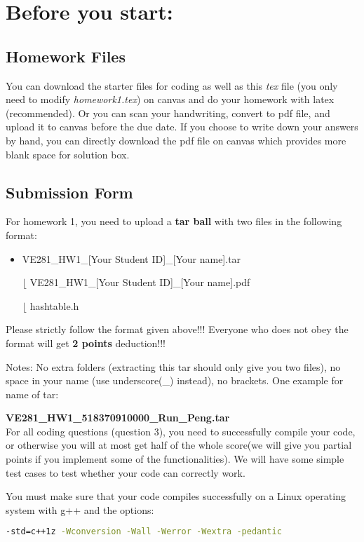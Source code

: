 \documentclass[11pt]{exam}
\begin{document}
\setlength{\parindent}{0pt}
\section*{Before you start:}

\subsection*{Homework Files}
You can download the starter files for coding as well as this \textit{tex} file (you only need to modify \textit{homework1.tex}) on canvas and do your homework with latex (recommended). Or you can scan your handwriting, convert to pdf file, and upload it to canvas before the due date. If you choose to write down your answers by hand, you can directly download the pdf file on canvas which provides more blank space for solution box.\\

\subsection*{Submission Form}
For homework 1, you need to upload a \textbf{tar ball} with two files in the following format:
\begin{itemize}
\item VE281\_HW1\_[Your Student ID]\_[Your name].tar

$\lfloor$ VE281\_HW1\_[Your Student ID]\_[Your name].pdf

$\lfloor$ hashtable.h

\end{itemize}
{\color{red}Please strictly follow the format given above!!! Everyone who does not obey the format will get \textbf{2 points} deduction!!!}

Notes: No extra folders (extracting this tar should only give you two files), no space in your name (use underscore(\_) instead), no brackets. One example for name of tar:

\textbf{VE281\_HW1\_518370910000\_Run\_Peng.tar}\\

For all coding questions (question 3), you need to successfully compile your code, or otherwise you will at most get half of the whole score(we will give you partial points if you implement some of the functionalities). We will have some simple test cases to test whether your code can correctly work.

You must make sure that your code compiles successfully on a Linux operating system with g++ and the options:
\begin{lstlisting}[language=bash]
-std=c++1z -Wconversion -Wall -Werror -Wextra -pedantic
\end{lstlisting}
\end{document}
